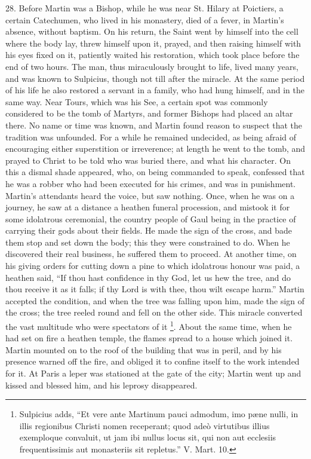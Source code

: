 28.
Before Martin was a Bishop, while he was near St. Hilary at Poictiers,
a certain Catechumen, who lived in his monastery, died of a fever, in
Martin's absence, without baptism. On his return, the Saint went by
himself into the cell where the body lay, threw himself upon it,
prayed, and then raising himself with his eyes fixed on it, patiently
waited his restoration, which took place before the end of two hours.
The man, thus miraculously brought to life, lived many years, and was
known to Sulpicius, though not till after the miracle. At the same
period of his life he also restored a servant in a family, who had
hung himself, and in the same way. Near Tours, which was his
See, a certain spot was commonly considered to be the tomb of Martyrs,
and former Bishops had placed an altar there. No name or time was
known, and Martin found reason to suspect that the tradition was
unfounded. For a while he remained undecided, as being afraid of
encouraging either superstition or irreverence; at length he went to
the tomb, and prayed to Christ to be told who was buried there, and
what his character. On this a dismal shade appeared, who, on being
commanded to speak, confessed that he was a robber who had been
executed for his crimes, and was in punishment. Martin's attendants
heard the voice, but saw nothing. Once, when he was on a journey, he
saw at a distance a heathen funeral procession, and mistook it for
some idolatrous ceremonial, the country people of Gaul being in the
practice of carrying their gods about their fields. He made the sign
of the cross, and bade them stop and set down the body; this they were
constrained to do. When he discovered their real business, he suffered
them to proceed. At another time, on his giving orders for cutting
down a pine to which idolatrous honour was paid, a heathen said, ``If
thou hast confidence in thy God, let us hew the tree, and do thou
receive it as it falls; if thy Lord is with thee, thou wilt escape
harm.'' Martin accepted the condition, and when the tree was falling
upon him, made the sign of the cross; the tree reeled round and
fell on the other side. This miracle converted the vast multitude who
were spectators of it \footnote{Sulpicius adds, ``Et vere ante Martinum
pauci admodum, imo pæne nulli, in illis regionibus Christi nomen
receperant; quod adeò virtutibus illius exemploque convaluit, ut jam
ibi nullus locus sit, qui non aut ecclesiis frequentissimis aut
monasteriis sit repletus.'' V. Mart. 10.}. About the same time, when he had set
on fire a heathen temple, the flames spread to a house which joined
it. Martin mounted on to the roof of the building that was in peril,
and by his presence warned off the fire, and obliged it to confine
itself to the work intended for it. At Paris a leper was stationed at
the gate of the city; Martin went up and kissed and blessed him, and
his leprosy disappeared.

